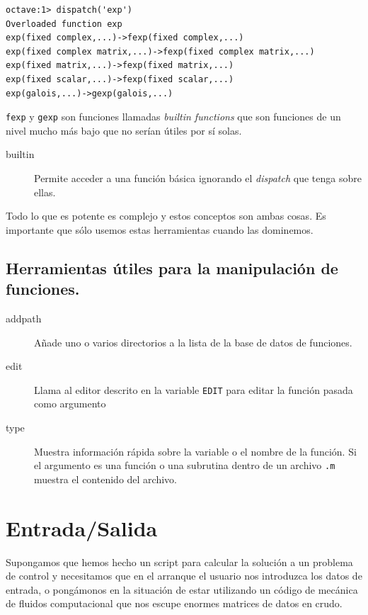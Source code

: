 \begin{verbatim}
octave:1> dispatch('exp')
Overloaded function exp
exp(fixed complex,...)->fexp(fixed complex,...)
exp(fixed complex matrix,...)->fexp(fixed complex matrix,...)
exp(fixed matrix,...)->fexp(fixed matrix,...)
exp(fixed scalar,...)->fexp(fixed scalar,...)
exp(galois,...)->gexp(galois,...)
\end{verbatim}
\texttt{fexp} y \texttt{gexp} son funciones llamadas \emph{builtin
  functions} que son funciones de un nivel mucho más bajo que no
serían útiles por sí solas.

\begin{description}
\item [builtin]Permite acceder a una función básica
  ignorando el \emph{dispatch} que tenga sobre ellas.
\end{description}
Todo lo que es potente es complejo y estos conceptos son ambas cosas.
Es importante que sólo usemos estas herramientas cuando las dominemos.


\subsection{Herramientas útiles para la manipulación de funciones.}

\begin{description}
\item [addpath]Añade uno o varios directorios a la
  lista de la base de datos de funciones.
\item [edit]Llama al editor descrito en la variable
  \texttt{EDIT} para editar la función pasada como argumento
\item [type]Muestra información rápida sobre la variable o
  el nombre de la función. Si el argumento es una función o una
  subrutina dentro de un archivo \texttt{.m} muestra el contenido del
  archivo.
\end{description}

\section{Entrada/Salida}

Supongamos que hemos hecho un script para calcular la solución a un
problema de control y necesitamos que en el arranque el usuario nos
introduzca los datos de entrada, o pongámonos en la situación de estar
utilizando un código de mecánica de fluidos computacional que nos
escupe enormes matrices de datos en crudo.

